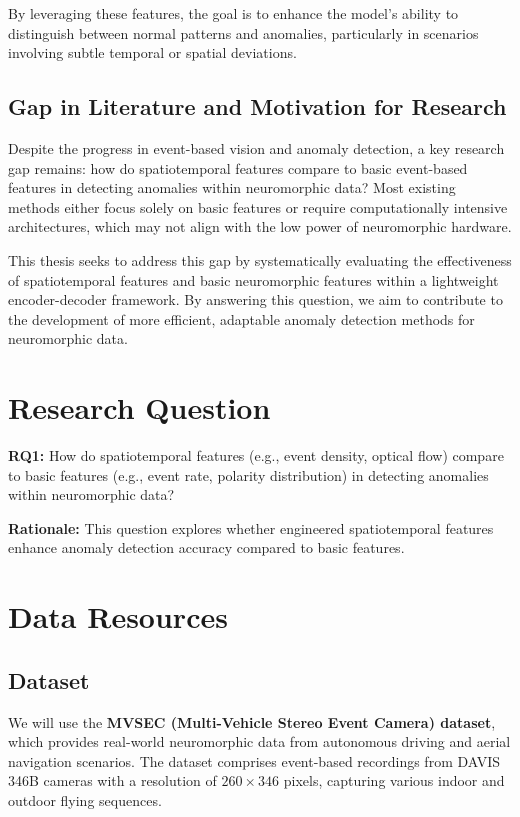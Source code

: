 \documentclass[12pt,a4paper]{article}
\begin{document}
By leveraging these features, the goal is to enhance the model's ability to distinguish between normal patterns and anomalies, particularly in scenarios involving subtle temporal or spatial deviations.

\subsection{Gap in Literature and Motivation for Research}

Despite the progress in event-based vision and anomaly detection, a key research gap remains: how do spatiotemporal features compare to basic event-based features in detecting anomalies within neuromorphic data? Most existing methods either focus solely on basic features or require computationally intensive architectures, which may not align with the low power of neuromorphic hardware.

This thesis seeks to address this gap by systematically evaluating the effectiveness of spatiotemporal features and basic neuromorphic features within a lightweight encoder-decoder framework. By answering this question, we aim to contribute to the development of more efficient, adaptable anomaly detection methods for neuromorphic data.

\section{Research Question}

\textbf{RQ1:} How do spatiotemporal features (e.g., event density, optical flow) compare to basic features (e.g., event rate, polarity distribution) in detecting anomalies within neuromorphic data?

\textbf{Rationale:} This question explores whether engineered spatiotemporal features enhance anomaly detection accuracy compared to basic features.

\section{Data Resources}

\subsection{Dataset}

We will use the \textbf{MVSEC (Multi-Vehicle Stereo Event Camera) dataset}, which provides real-world neuromorphic data from autonomous driving and aerial navigation scenarios. The dataset comprises event-based recordings from DAVIS 346B cameras with a resolution of $260 \times 346$ pixels, capturing various indoor and outdoor flying sequences.
\end{document}
